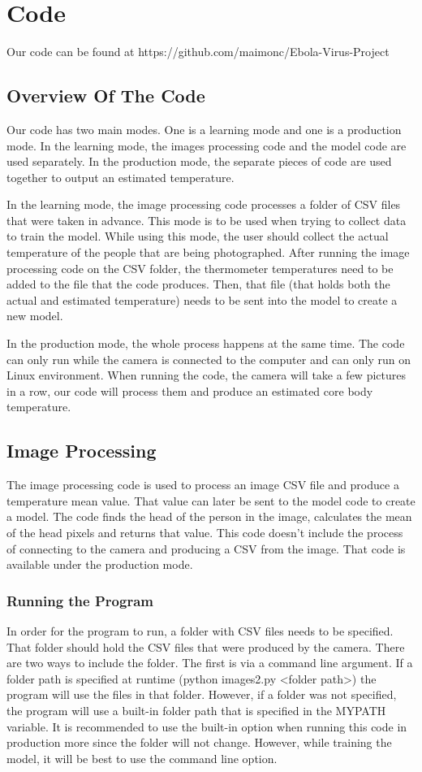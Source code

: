 \section*{Code}
	Our code can be found at https://github.com/maimonc/Ebola-Virus-Project
\subsection*{Overview Of The Code}
	Our code has two main modes. One is a learning mode and one is a production mode. In the learning mode, the images processing code and the model code are used separately. In the production mode, the separate pieces of code are used together to output an estimated temperature. 
	
	In the learning mode, the image processing code processes a folder of CSV files that were taken in advance. This mode is to be used when trying to collect data to train the model. While using this mode, the user should collect the actual temperature of the people that are being photographed. After running the image processing code on the CSV folder, the thermometer temperatures need to be added to the file that the code produces. Then, that file (that holds both the actual and estimated temperature) needs to be sent into the model to create a new model. 
	
	In the production mode, the whole process happens at the same time. The code can only run while the camera is connected to the computer and can only run on Linux environment. When running the code, the camera will take a few pictures in a row, our code will process them and produce an estimated core body temperature. 

\subsection*{Image Processing}
The image processing code is used to process an image CSV file and produce a temperature mean value. That value can later be sent to the model code to create a model. The code finds the head of the person in the image, calculates the mean of the head pixels and returns that value. This code doesn’t include the process of connecting to the camera and producing a CSV from the image. That code is available under the production mode. 

\subsubsection*{Running the Program}
	In order for the program to run, a folder with CSV files needs to be specified. That folder should hold the CSV files that were produced by the camera. There are two ways to include the folder. The first is via a command line argument. If a folder path is specified at runtime (python images2.py <folder path>) the program will use the files in that folder. However, if a folder was not specified, the program will use a built-in folder path that is specified in the MYPATH variable. It is recommended to use the built-in option when running this code in production more since the folder will not change. However, while training the model, it will be best to use the command line option. 
	
